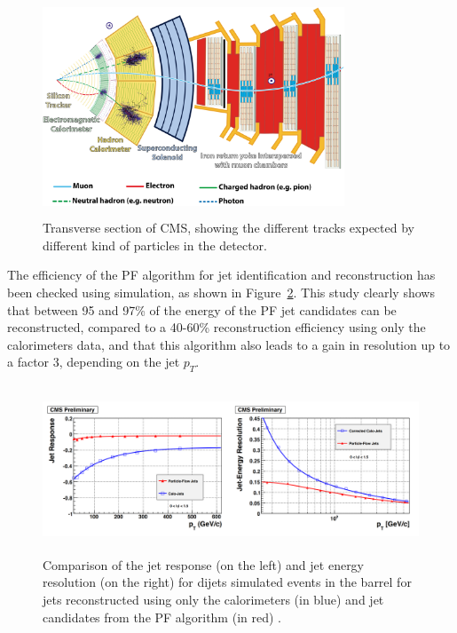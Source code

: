 \documentclass[a4paper, 10pt, openright]{report}
\begin{document}
\begin{figure}[htbp]
\begin{center}
\includegraphics[width=9cm, height=6.5cm]{figs/CMSIdentify.png}
\caption{Transverse section of \ac{CMS}, showing the different tracks expected by different kind of particles in the detector.}
\label{fig:CMSIdentify}
\end{center}
\end{figure}

The efficiency of the \ac{PF} algorithm for jet identification and reconstruction has been checked using simulation, as shown in Figure~\ref{fig:PFSimu}. This study clearly shows that between 95 and 97\% of the energy of the \ac{PF} jet candidates can be reconstructed, compared to a 40-60\% reconstruction efficiency using only the calorimeters data, and that this algorithm also leads to a gain in resolution up to a factor 3, depending on the jet $p_T$.

\begin{figure}[htbp]
\begin{center}
\includegraphics[width=12cm, height=5cm]{figs/PFSimu.png}
\caption{Comparison of the jet response (on the left) and jet energy resolution (on the right) for dijets simulated events in the barrel for jets reconstructed using only the calorimeters (in blue) and jet candidates from the \ac{PF} algorithm (in red) \cite{PF2}.}
\label{fig:PFSimu}
\end{center}
\end{figure}
\end{document}
